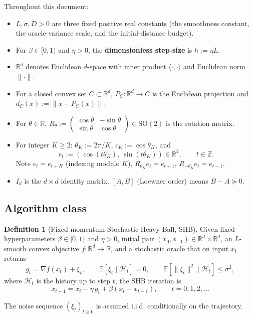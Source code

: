 \documentclass[11pt,a4paper]{article}
\theoremstyle{plain}
\theoremstyle{definition}
\newtheorem{definition}[theorem]{Definition}
\theoremstyle{remark}
\newcommand{\R}{\mathbb{R}}
\newcommand{\E}{\mathbb{E}}
\begin{document}
Throughout this document:

\begin{itemize}
\item $L, \sigma, D > 0$ are three fixed positive real constants (the smoothness constant, the oracle-variance scale, and the initial-distance budget).
\item For $\beta \in [0,1)$ and $\eta > 0$, the \textbf{dimensionless step-size} is $h := \eta L$.
\item $\R^d$ denotes Euclidean $d$-space with inner product $\langle\cdot,\cdot\rangle$ and Euclidean norm $\|\cdot\|$.
\item For a closed convex set $C \subset \R^d$, $P_C : \R^d \to C$ is the Euclidean projection and $d_C(x) := \|x - P_C(x)\|$.
\item For $\theta \in \R$, $R_\theta := \begin{pmatrix}\cos\theta & -\sin\theta\\ \sin\theta & \cos\theta\end{pmatrix} \in \mathrm{SO}(2)$ is the rotation matrix.
\item For integer $K \geq 2$: $\theta_K := 2\pi/K$, $c_K := \cos\theta_K$, and
  \[
    e_t := (\cos(t\theta_K),\ \sin(t\theta_K)) \in \R^2,\qquad t \in \mathbb{Z}.
  \]
  Note $e_t = e_{t+K}$ (indexing modulo $K$), $R_{\theta_K} e_t = e_{t+1}$, $R_{-\theta_K} e_t = e_{t-1}$.
\item $I_d$ is the $d\times d$ identity matrix. $[A, B]$ (Loewner order) means $B - A \succeq 0$.
\end{itemize}

\subsection{Algorithm class}

\begin{definition}[Fixed-momentum Stochastic Heavy Ball, SHB]
Given fixed hyperparameters $\beta \in [0,1)$ and $\eta > 0$, initial pair $(x_0, x_{-1}) \in \R^d \times \R^d$, an $L$-smooth convex objective $f:\R^d \to \R$, and a stochastic oracle that on input $x_t$ returns
\[
g_t = \nabla f(x_t) + \xi_t, \qquad \E[\xi_t \mid \mathcal{H}_t] = 0,\qquad \E[\|\xi_t\|^2 \mid \mathcal{H}_t] \leq \sigma^2,
\]
where $\mathcal{H}_t$ is the history up to step $t$, the SHB iteration is
\begin{equation}
\boxed{\ x_{t+1} = x_t - \eta\, g_t + \beta(x_t - x_{t-1}),\qquad t = 0, 1, 2, \ldots\ }\tag{SHB}\label{eq:SHB}
\end{equation}

The noise sequence $(\xi_t)_{t\geq 0}$ is assumed i.i.d. conditionally on the trajectory.
\end{definition}
\end{document}

